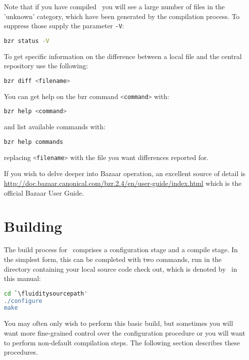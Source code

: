 Note that if you have compiled \fluidity\ you will see a large number of files
in the 'unknown' category, which have been generated by the compilation
process. To suppress those supply the parameter \lstinline[language=Bash]+-V+:
\begin{lstlisting}[language=Bash]
bzr status -V
\end{lstlisting}

To get specific information on the difference between a local file and
the central repository use the following:
\begin{lstlisting}[language=Bash]
bzr diff <filename>
\end{lstlisting}

You can get help on the bzr command \lstinline[language=Bash]+<command>+
with:
\begin{lstlisting}[language=Bash]
bzr help <command>
\end{lstlisting}
and list available commands with:
\begin{lstlisting}[language=Bash]
bzr help commands
\end{lstlisting}

replacing \lstinline[language=Bash]+<filename>+ with the file you want
differences reported for.

If you wish to delve deeper into Bazaar operation, an excellent source of
detail is
\href{http://doc.bazaar.canonical.com/bzr.2.4/en/user-guide/index.html}
{http://doc.bazaar.canonical.com/bzr.2.4/en/user-guide/index.html}
which is the official Bazaar User Guide.

\section{Building \fluidity}
\label{sec:building_fluidity}

The build process for \fluidity\ comprises a configuration stage and a compile
stage. In the simplest form, this can be completed with two commands, run in
the directory containing your local source code check out, which is denoted
by \fluiditysourcepath\ in this manual:

\begin{lstlisting}[language=Bash]
cd `\fluiditysourcepath' 
./configure
make
\end{lstlisting}

You may often only wish to perform this basic build, but sometimes you will
want more fine-grained control over the configuration procedure or you will
want to perform non-default compilation steps. The following section describes
these procedures.

